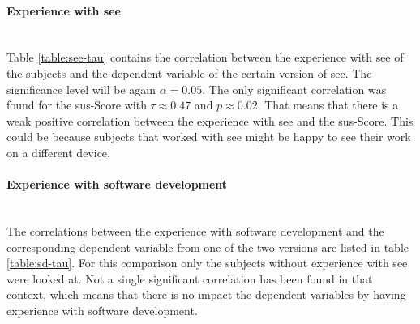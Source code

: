 \paragraph{Experience with \gls{see}}\mbox{}\\
Table \ref{table:see-tau} contains the correlation between the experience with \gls{see} of the subjects and the dependent variable of the certain version of \gls{see}.
The significance level will be again $\alpha = 0.05$.
The only significant correlation was found for the \gls{sus}-Score with $\tau \approx 0.47$ and $p \approx 0.02$. 
That means that there is a weak positive correlation between the experience with \gls{see} and the \gls{sus}-Score.
This could be because subjects that worked with \gls{see} might be happy to see their work on a different device.

\begin{table}[]
  \caption{Correlation between experience with \gls{see} and the dependent variables calculated with the \gls{tau}}
  \label{table:see-tau}
  \end{table}

\paragraph{Experience with software development}\mbox{}\\
The correlations between the experience with software development and the corresponding dependent variable from one of the two versions are listed in table \ref{table:sd-tau}.
For this comparison only the subjects without experience with \gls{see} were looked at.
Not a single significant correlation has been found in that context, which means that there is no impact the dependent variables by having experience with software development.


